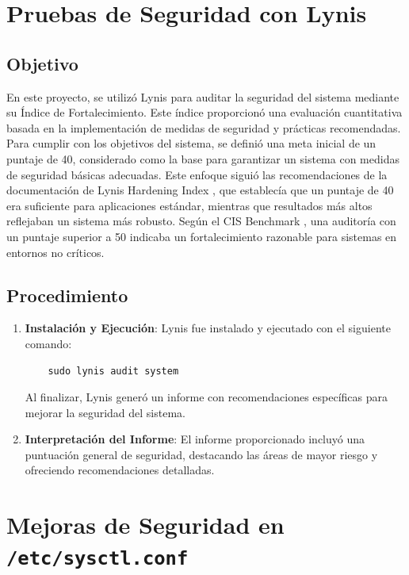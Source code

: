 \section{Pruebas de Seguridad con Lynis}

\subsection{Objetivo}
En este proyecto, se utilizó Lynis para auditar la seguridad del sistema mediante su Índice de Fortalecimiento. Este índice proporcionó una evaluación cuantitativa basada en la implementación de medidas de seguridad y prácticas recomendadas. Para cumplir con los objetivos del sistema, se definió una meta inicial de un puntaje de 40, considerado como la base para garantizar un sistema con medidas de seguridad básicas adecuadas. Este enfoque siguió las recomendaciones de la documentación de Lynis Hardening Index \cite{LynisHardeningIndex}, que establecía que un puntaje de 40 era suficiente para aplicaciones estándar, mientras que resultados más altos reflejaban un sistema más robusto. Según el CIS Benchmark \cite{CISBenchmarksReport}, una auditoría con un puntaje superior a 50 indicaba un fortalecimiento razonable para sistemas en entornos no críticos.

\subsection{Procedimiento}
\begin{enumerate}
    \item \textbf{Instalación y Ejecución}: Lynis fue instalado y ejecutado con el siguiente comando:
    \begin{verbatim}
    sudo lynis audit system
    \end{verbatim}
    Al finalizar, Lynis generó un informe con recomendaciones específicas para mejorar la seguridad del sistema.
    
    \item \textbf{Interpretación del Informe}: El informe proporcionado incluyó una puntuación general de seguridad, destacando las áreas de mayor riesgo y ofreciendo recomendaciones detalladas. 
\end{enumerate}

\section{Mejoras de Seguridad en \texttt{/etc/sysctl.conf}}

